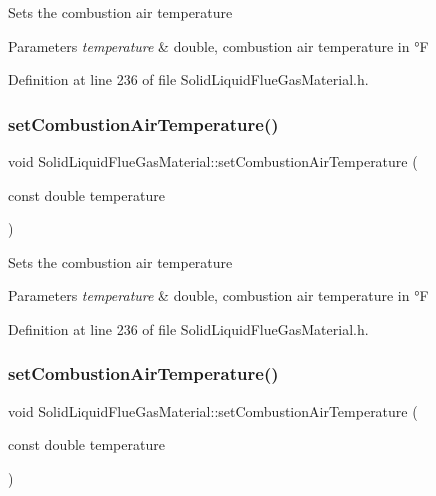Sets the combustion air temperature 
\begin{DoxyParams}{Parameters}
{\em temperature} & double, combustion air temperature in °F \\
\hline
\end{DoxyParams}


Definition at line 236 of file Solid\+Liquid\+Flue\+Gas\+Material.\+h.

\mbox{\label{class_solid_liquid_flue_gas_material_a626dfbc9ba87abff99e5c5a8204d69c6}} 
\subsubsection{\texorpdfstring{set\+Combustion\+Air\+Temperature()}{setCombustionAirTemperature()}\hspace{0.1cm}{\footnotesize\ttfamily [2/3]}}
{\footnotesize\ttfamily void Solid\+Liquid\+Flue\+Gas\+Material\+::set\+Combustion\+Air\+Temperature (\begin{DoxyParamCaption}\item[{const double}]{temperature }\end{DoxyParamCaption})\hspace{0.3cm}{\ttfamily [inline]}}

Sets the combustion air temperature 
\begin{DoxyParams}{Parameters}
{\em temperature} & double, combustion air temperature in °F \\
\hline
\end{DoxyParams}


Definition at line 236 of file Solid\+Liquid\+Flue\+Gas\+Material.\+h.

\mbox{\label{class_solid_liquid_flue_gas_material_a626dfbc9ba87abff99e5c5a8204d69c6}} 
\subsubsection{\texorpdfstring{set\+Combustion\+Air\+Temperature()}{setCombustionAirTemperature()}\hspace{0.1cm}{\footnotesize\ttfamily [3/3]}}
{\footnotesize\ttfamily void Solid\+Liquid\+Flue\+Gas\+Material\+::set\+Combustion\+Air\+Temperature (\begin{DoxyParamCaption}\item[{const double}]{temperature }\end{DoxyParamCaption})\hspace{0.3cm}{\ttfamily [inline]}}

